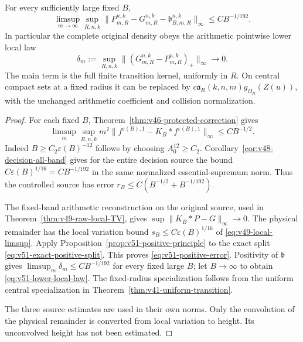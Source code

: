\begin{theorem}
\label{thm:v51-positive-error}
For every sufficiently large fixed $B$,
\begin{equation}\label{eq:v51-positive-error}
 \limsup_{m\to\infty}\sup_{R,n,k}
 \|P_{m,R}^{n,k}-G_{m,R}^{n,k}-\mathfrak b_{B,m,R}^{n,k}\|_\infty
                                                   \le CB^{-1/192}.
\end{equation}
In particular the complete original density obeys the arithmetic
pointwise lower local law
\begin{equation}\label{eq:v51-lower-local-law}
 \delta_m:=\sup_{R,n,k}
       \|(G_{m,R}^{n,k}-P_{m,R}^{n,k})_+\|_\infty
                                      \longrightarrow0.
\end{equation}
The main term is the full finite transition kernel, uniformly in
$R$. On central compact sets at a fixed radius it can be replaced
by $c\mathfrak a_R(k,n,m)g_{\Omega_R}(Z(u))$, with the unchanged
arithmetic coefficient and collision normalization.
\end{theorem}
\begin{proof}
For each fixed $B$, Theorem~\ref{thm:v46-protected-correction}
gives
\[
 \limsup_m\sup_{R,n,k}m^2
 \|f^{\varepsilon(B),1}-K_B*f^{\varepsilon(B),1}\|_\infty
                                                    \le CB^{-1/2}.
\]
Indeed $B\ge C_2\varepsilon(B)^{-12}$ follows by choosing
$A_0^{12}\ge C_2$. Corollary~\ref{cor:v48-decision-all-band}
gives for the entire decision source the bound
$C\varepsilon(B)^{1/16}=CB^{-1/192}$ in the same normalized
essential-supremum norm. Thus the controlled source has error
$r_B\le C(B^{-1/2}+B^{-1/192})$.

The fixed-band arithmetic reconstruction on the original source,
used in Theorem~\ref{thm:v49-raw-local-TV}, gives
$\sup\|K_B*P-G\|_\infty\to0$.
The physical remainder has the local variation bound
$s_B\le C\varepsilon(B)^{1/16}$ of
\eqref{eq:v49-local-limsup}. Apply
Proposition~\ref{prop:v51-positive-principle} to the exact
split \eqref{eq:v51-exact-positive-split}. This proves
\eqref{eq:v51-positive-error}. Positivity of $\mathfrak b$ gives
$\limsup_m\delta_m\le CB^{-1/192}$ for every fixed large $B$;
let $B\to\infty$ to obtain \eqref{eq:v51-lower-local-law}.
The fixed-radius specialization follows from the uniform central
specialization in Theorem~\ref{thm:v41-uniform-transition}.

The three source estimates are used in their own norms. Only the
convolution of the physical remainder is converted from local
variation to height. Its unconvolved height has not been estimated.
\end{proof}

